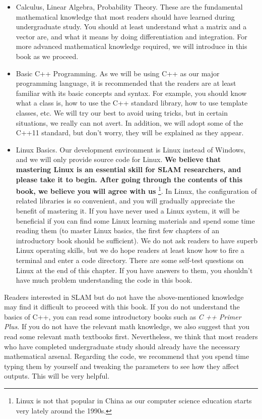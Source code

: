 \begin{itemize}
	\item Calculus, Linear Algebra, Probability Theory. These are the fundamental mathematical knowledge that most readers should have learned during undergraduate study. You should at least understand what a matrix and a vector are, and what it means by doing differentiation and integration. For more advanced mathematical knowledge required, we will introduce in this book as we proceed.
	\item Basic C++ Programming. As we will be using C++ as our major programming language, it is recommended that the readers are at least familiar with its basic concepts and syntax. For example, you should know what a class is, how to use the C++ standard library, how to use template classes, etc. We will try our best to avoid using tricks, but in certain situations, we really can not avert. In addition, we will adopt some of the C++11 standard, but don't worry, they will be explained as they appear.
	
	\item Linux Basics. Our development environment is Linux instead of Windows, and we will only provide source code for Linux. \textbf{We believe that mastering Linux is an essential skill for SLAM researchers, and please take it to begin. After going through the contents of this book, we believe you will agree with us} \footnote{Linux is not that popular in China as our computer science education starts very lately around the 1990s.}. In Linux, the configuration of related libraries is so convenient, and you will gradually appreciate the benefit of mastering it. If you have never used a Linux system, it will be beneficial if you can find some Linux learning materials and spend some time reading them (to master Linux basics, the first few chapters of an introductory book should be sufficient). We do not ask readers to have superb Linux operating skills, but we do hope readers at least know how to fire a terminal and enter a code directory. There are some self-test questions on Linux at the end of this chapter. If you have answers to them, you shouldn't have much problem understanding the code in this book.
\end{itemize}


Readers interested in SLAM but do not have the above-mentioned knowledge may find it difficult to proceed with this book. If you do not understand the basics of C++, you can read some introductory books such as \textit{C ++ Primer Plus}. If you do not have the relevant math knowledge, we also suggest that you read some relevant math textbooks first. Nevertheless, we think that most readers who have completed undergraduate study should already have the necessary mathematical arsenal. Regarding the code, we recommend that you spend time typing them by yourself and tweaking the parameters to see how they affect outputs. This will be very helpful.


